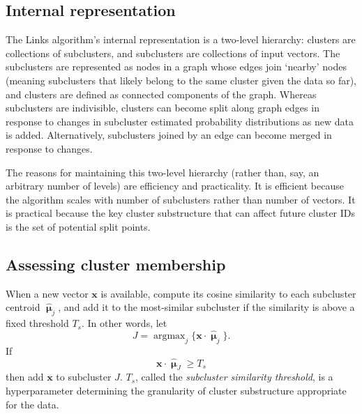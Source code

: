 \documentclass{article}
\DeclareMathOperator*{\argmax}{argmax}
\begin{document}
\subsection{Internal representation}
\label{sec:internal}

The Links algorithm's internal representation is a two-level hierarchy: clusters are collections of subclusters, and subclusters are collections of input vectors.  The subclusters are represented as nodes in a graph whose edges join `nearby' nodes (meaning subclusters that likely belong to the same cluster given the data so far), and clusters are defined as connected components of the graph.  Whereas subclusters are indivisible, clusters can become split along graph edges in response to changes in subcluster estimated probability distributions as new data is added. Alternatively, subclusters joined by an edge can become merged in response to changes.

The reasons for maintaining this two-level hierarchy (rather than, say, an arbitrary number of levels) are efficiency and practicality. It is efficient because the algorithm scales with number of subclusters rather than number of vectors.  It is practical because the key cluster substructure that can affect future cluster IDs is the set of potential split points.

\subsection{Assessing cluster membership}
\label{sec:assessing}

When a new vector $\mathbf{x}$ is available, compute its cosine similarity to each subcluster centroid $\bm{\hat{\upmu}}_j$, and add it to the most-similar subcluster if the similarity is above a fixed threshold $T_s$.
In other words, let
\begin{equation}
J = \argmax_j\{\mathbf{x}\cdot\bm{\hat{\upmu}}_j\}.
\end{equation}
If
\begin{equation}\label{eqn:subcluster}
\mathbf{x}\cdot\bm{\hat{\upmu}}_J\geq T_s
\end{equation}
then add $\mathbf{x}$ to subcluster $J$. $T_s$, called the \textit{subcluster similarity threshold}, is a hyperparameter determining the granularity of cluster substructure appropriate for the data.
\end{document}
